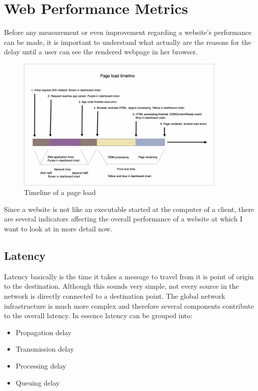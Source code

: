 \chapter{Web Performance Metrics}
\label{chap:metrics}
Before any measurement or even improvement regarding a website's performance can be made, it is important to understand what actually are the reasons for the delay until a user can see the rendered webpage in her browser. 
\begin{figure}[h!]
	\centering
      		\includegraphics[width=0.9\textwidth]{imgs/timeline}
  	\caption{Timeline of a page load \cite{NewRelic_Load}}
\end{figure}
Since a website is not like an executable started at the computer of a client, there are several indicators affecting the overall performance of a website at which I want to look at in more detail now.  

\section{Latency}
Latency basically is the time it takes a message to travel from it is point of origin to the destination. Although this sounds very simple, not every source in the network is directly connected to a destination point. The global network infrastructure is much more complex and therefore several components contribute to the overall latency. In essence latency can be grouped into:
\begin{itemize}
	\item{Propagation delay}
	\item{Transmission delay}
	\item{Processing delay}
	\item{Queuing delay}
\end{itemize}

